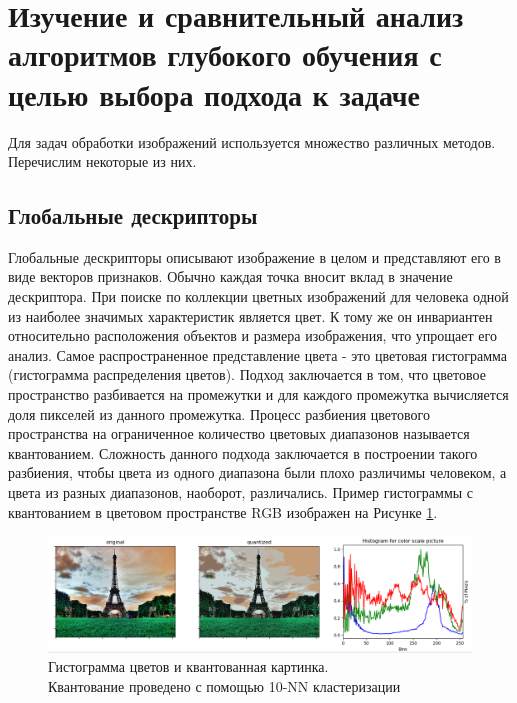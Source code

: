 \section{Изучение и сравнительный анализ алгоритмов глубокого обучения с целью выбора подхода к задаче}

Для задач обработки изображений используется множество различных методов. Перечислим некоторые из них.

\subsection{Глобальные дескрипторы}

Глобальные дескрипторы описывают изображение в целом и представляют его в виде векторов признаков. Обычно каждая точка вносит вклад в значение дескриптора.
При поиске по коллекции цветных изображений для человека одной из наиболее значимых характеристик является цвет. К тому же он инвариантен относительно расположения объектов и размера изображения, что упрощает его анализ. Самое распространенное представление цвета - это цветовая гистограмма \cite{colorhist_2018} (гистограмма
распределения цветов). Подход заключается в том, что цветовое пространство разбивается
на промежутки и для каждого промежутка вычисляется доля пикселей из данного
промежутка. Процесс разбиения цветового пространства на ограниченное количество
цветовых диапазонов называется квантованием. Сложность данного подхода заключается
в построении такого разбиения, чтобы цвета из одного диапазона были плохо различимы
человеком, а цвета из разных диапазонов, наоборот, различались. Пример гистограммы с
квантованием в цветовом пространстве RGB изображен на Рисунке \ref{pic:exchist}.


\begin{figure}%
	\begin{center}
		\includegraphics[width=.9\columnwidth]{./img/hist_0}%
	\end{center}
	\caption{Гистограмма цветов и квантованная картинка.\\ Квантование проведено с помощью 10-NN кластеризации}%
	\label{pic:exchist}%
\end{figure}


